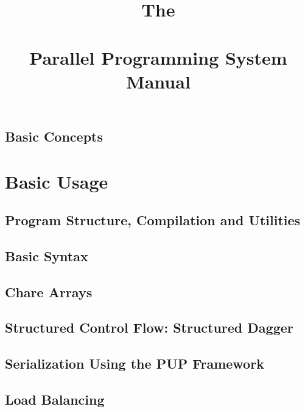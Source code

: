 \documentclass[10pt]{report}
\begin{document}
\title{The\\ \charm\\ Parallel Programming System\\ Manual}
\credits{\hspace{0 in}}
\maketitle


\chapter{Basic Concepts}




\part{Basic Usage}

\chapter{Program Structure, Compilation and Utilities}
  	
  
  

\chapter{Basic Syntax}
  	
  
  

\chapter{Chare Arrays}
  

\chapter{Structured Control Flow: Structured Dagger}
\label{sec:sdag}
  

\chapter{Serialization Using the PUP Framework}
  

\chapter{Load Balancing}
\label{loadbalancing}
  
\end{document}

